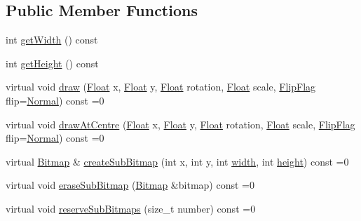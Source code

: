 \subsection*{Public Member Functions}
\begin{DoxyCompactItemize}
\item 
int \hyperlink{classZeta_1_1Bitmap_a5b41472f13ef2763ef6c4c6e85a706da}{get\+Width} () const 
\item 
int \hyperlink{classZeta_1_1Bitmap_ae35e49275691a0b9a5b67b5fb906941b}{get\+Height} () const 
\item 
virtual void \hyperlink{classZeta_1_1Bitmap_a2a5af6ab1c1237efe52d155fe63e24b7}{draw} (\hyperlink{namespaceZeta_a1e0a1265f9b3bd3075fb0fabd39088ba}{Float} x, \hyperlink{namespaceZeta_a1e0a1265f9b3bd3075fb0fabd39088ba}{Float} y, \hyperlink{namespaceZeta_a1e0a1265f9b3bd3075fb0fabd39088ba}{Float} rotation, \hyperlink{namespaceZeta_a1e0a1265f9b3bd3075fb0fabd39088ba}{Float} scale, \hyperlink{classZeta_1_1Bitmap_a8cb28cf4226b7d6bedf6c9bb2413b3fa}{Flip\+Flag} flip=\hyperlink{classZeta_1_1Bitmap_a8cb28cf4226b7d6bedf6c9bb2413b3faad95504740b4fa9384ac72564cd282755}{Normal}) const =0
\item 
virtual void \hyperlink{classZeta_1_1Bitmap_af06b42874ae626ca8e403c478fab46e9}{draw\+At\+Centre} (\hyperlink{namespaceZeta_a1e0a1265f9b3bd3075fb0fabd39088ba}{Float} x, \hyperlink{namespaceZeta_a1e0a1265f9b3bd3075fb0fabd39088ba}{Float} y, \hyperlink{namespaceZeta_a1e0a1265f9b3bd3075fb0fabd39088ba}{Float} rotation, \hyperlink{namespaceZeta_a1e0a1265f9b3bd3075fb0fabd39088ba}{Float} scale, \hyperlink{classZeta_1_1Bitmap_a8cb28cf4226b7d6bedf6c9bb2413b3fa}{Flip\+Flag} flip=\hyperlink{classZeta_1_1Bitmap_a8cb28cf4226b7d6bedf6c9bb2413b3faad95504740b4fa9384ac72564cd282755}{Normal}) const =0
\item 
virtual \hyperlink{classZeta_1_1Bitmap}{Bitmap} \& \hyperlink{classZeta_1_1Bitmap_a790614f445f0c59f9533ed1d4046dd74}{create\+Sub\+Bitmap} (int x, int y, int \hyperlink{classZeta_1_1Bitmap_affa526cccd51b4ac5db7aac25ff7f6a9}{width}, int \hyperlink{classZeta_1_1Bitmap_a4d9a82acc6c418dc9b72227b0d63d9aa}{height}) const =0
\item 
virtual void \hyperlink{classZeta_1_1Bitmap_acaef132548ff57ccdc725b864a1150b8}{erase\+Sub\+Bitmap} (\hyperlink{classZeta_1_1Bitmap}{Bitmap} \&bitmap) const =0
\item 
virtual void \hyperlink{classZeta_1_1Bitmap_afc49ceff653f55699fe7b723eb6193ae}{reserve\+Sub\+Bitmaps} (size\+\_\+t number) const =0
\item 

\end{DoxyCompactItemize}
